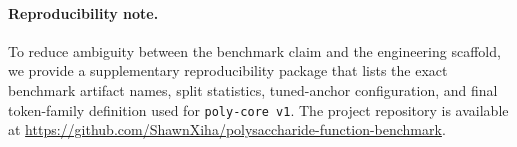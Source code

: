 \documentclass{article}
\begin{document}
\paragraph{Reproducibility note.}
To reduce ambiguity between the benchmark claim and the engineering scaffold, we provide a supplementary reproducibility package that lists the exact benchmark artifact names, split statistics, tuned-anchor configuration, and final token-family definition used for \texttt{poly-core v1}. The project repository is available at \url{https://github.com/ShawnXiha/polysaccharide-function-benchmark}.



\end{document}
